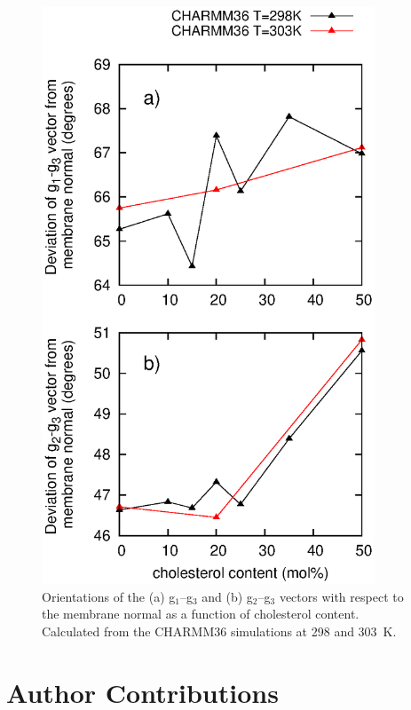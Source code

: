 \documentclass[journal=jacsat,manuscript=article]{achemso}
\begin{document}
\begin{figure}[]
  \centering
  \includegraphics[height=17.2cm]{../Fig/GlycerolOrientation.eps}
  \caption{\label{GlycerolOrientation}
    Orientations of the (a) g$_1$--g$_3$ and (b) g$_2$--g$_3$ vectors with respect to the membrane normal
    as a function of cholesterol content.
    Calculated from the CHARMM36 simulations at 298 and 303~K.}
\end{figure}


\newpage

\section{Author Contributions}
\end{document}
